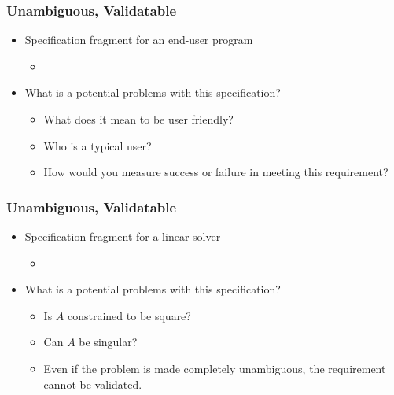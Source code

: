 \documentclass[t,12pt,numbers,fleqn]{beamer}
\begin{document}

\begin{frame}
\frametitle{Unambiguous, Validatable}

\begin{itemize}

\item Specification fragment for an end-user program
\begin{itemize}
\item {}
\end{itemize}
\item What is a potential problems with this specification?
\begin{itemize}
\item<2-> {\alert{What does it mean to be user friendly?}}
\item<2-> {\alert{Who is a typical user?}}
\item<2-> {\alert{How would you measure success or failure in meeting this requirement?}}
\end{itemize}

\end{itemize}

\end{frame}


\begin{frame}
\frametitle{Unambiguous, Validatable}

\begin{itemize}

\item Specification fragment for a linear solver
\begin{itemize}
\item {}
\end{itemize}
\item What is a potential problems with this specification?
\begin{itemize}
\item<2-> {\alert{Is $A$ constrained to be square?}}
\item<2-> {\alert{Can $A$ be singular?}}
\item<2-> {\alert{Even if the problem is made completely unambiguous, the requirement cannot be validated.}}
\end{itemize}

\end{itemize}

\end{frame}
\end{document}
